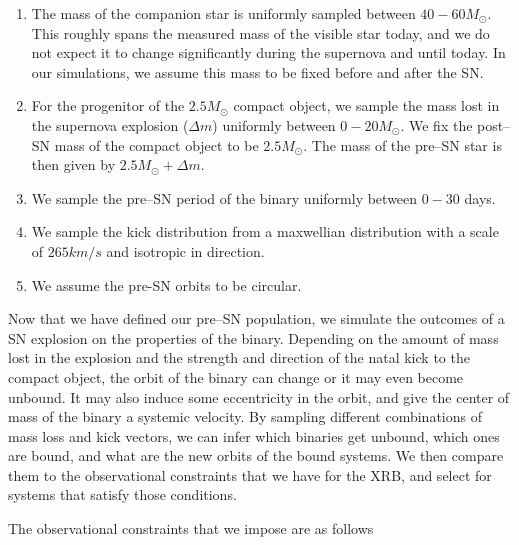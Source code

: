 \documentclass[linenumbers,trackchanges,twocolumn]{aastex701}
\begin{document}
\begin{enumerate}
        \item The mass of the companion star is uniformly sampled between $40-60M_{\odot}$. This roughly spans the measured mass of the visible star today, and we do not expect it to change significantly during the supernova and until today. In our simulations, we assume this mass to be fixed before and after the SN.
        \item For the progenitor of the $2.5M_{\odot}$ compact object, we sample the mass lost in the supernova explosion ($\Delta m$) uniformly between $0-20M_{\odot}$. We fix the post--SN mass of the compact object to be $2.5M_{\odot}$. The mass of the pre--SN star is then given by $2.5M_{\odot}+\Delta m$.
        \item We sample the pre--SN period of the binary uniformly between $0-30$ days.
        \item We sample the kick distribution from a maxwellian distribution with a scale of $265 km/s$ and isotropic in direction.
        \item We assume the pre-SN orbits to be circular.
\end{enumerate}

Now that we have defined our pre--SN population, we simulate the outcomes of a SN explosion on the properties of the binary. Depending on the amount of mass lost in the explosion and the strength and direction of the natal kick to the compact object, the orbit of the binary can change or it may even become unbound. It may also induce some eccentricity in the orbit, and give the center of mass of the binary a systemic velocity. By sampling different combinations of mass loss and kick vectors, we can infer which binaries get unbound, which ones are bound, and what are the new orbits of the bound systems. We then compare them to the observational constraints that we have for the XRB, and select for systems that satisfy those conditions.

The observational constraints that we impose are as follows 
\end{document}
